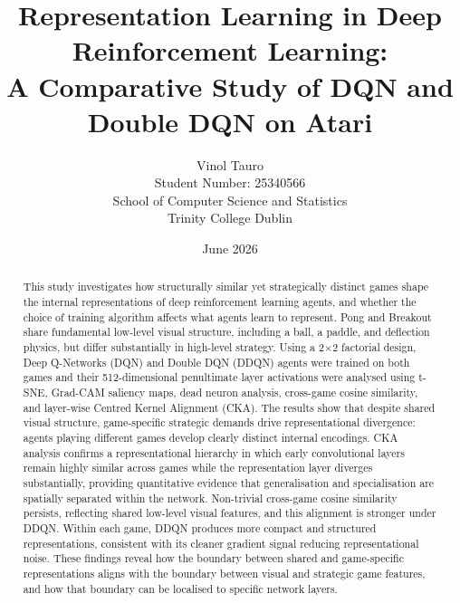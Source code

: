 \documentclass[a4paper]{article}
\begin{document}
\title{\textbf{Representation Learning in Deep Reinforcement Learning:}\\
       \large A Comparative Study of DQN and Double DQN on Atari}
\author{Vinol Tauro\\
        \small Student Number: 25340566\\
        \small School of Computer Science and Statistics\\
        \small Trinity College Dublin}
\date{June 2026}
\maketitle

\begin{abstract}
This study investigates how structurally similar yet strategically distinct games shape the internal representations of deep reinforcement learning agents, and whether the choice of training algorithm affects what agents learn to represent. Pong and Breakout share fundamental low-level visual structure, including a ball, a paddle, and deflection physics, but differ substantially in high-level strategy. Using a 2$\times$2 factorial design, Deep Q-Networks (DQN) and Double DQN (DDQN) agents were trained on both games and their 512-dimensional penultimate layer activations were analysed using t-SNE, Grad-CAM saliency maps, dead neuron analysis, cross-game cosine similarity, and layer-wise Centred Kernel Alignment (CKA). The results show that despite shared visual structure, game-specific strategic demands drive representational divergence: agents playing different games develop clearly distinct internal encodings. CKA analysis confirms a representational hierarchy in which early convolutional layers remain highly similar across games while the representation layer diverges substantially, providing quantitative evidence that generalisation and specialisation are spatially separated within the network. Non-trivial cross-game cosine similarity persists, reflecting shared low-level visual features, and this alignment is stronger under DDQN. Within each game, DDQN produces more compact and structured representations, consistent with its cleaner gradient signal reducing representational noise. These findings reveal how the boundary between shared and game-specific representations aligns with the boundary between visual and strategic game features, and how that boundary can be localised to specific network layers.
\end{abstract}

\tableofcontents
\newpage
\end{document}
